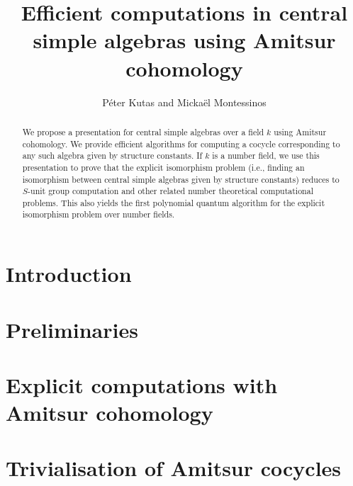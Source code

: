 \documentclass{article}
\title{Efficient computations in central simple algebras using Amitsur cohomology}
\author{Péter Kutas and Mickaël Montessinos}
\theoremstyle{definition}
\theoremstyle{remark}
\newcommand{\1}{\mathbf{1}}
\begin{document}
\maketitle

\begin{abstract}
    We propose a presentation for central simple algebras over a field \(k\) using Amitsur cohomology. We provide efficient algorithms for computing a cocycle corresponding to any such algebra given by structure constants. If \(k\) is a number field, we use this presentation to prove that the explicit isomorphism problem (i.e., finding an isomorphism between central simple algebras given by structure constants) reduces to \(S\)-unit group computation and other related number theoretical computational problems. This also yields the first polynomial quantum algorithm for the explicit isomorphism problem over number fields.
\end{abstract}

\section{Introduction}


\section{Preliminaries}\label{Sec:Prelim}


%

\section{Explicit computations with Amitsur cohomology}\label{Sec:Amitsur}


\section{Trivialisation of Amitsur cocycles}\label{Sec:Trivialisation}


%

%

%



\end{document}
